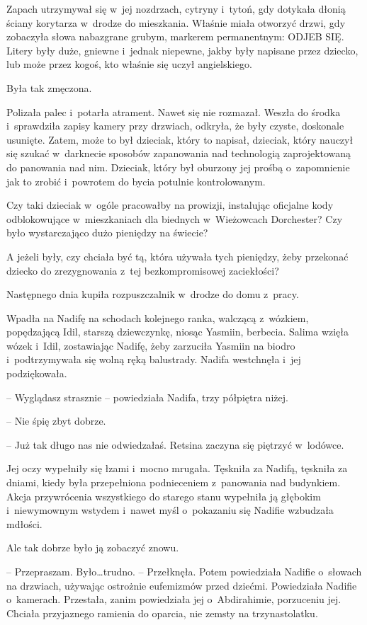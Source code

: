 \documentclass[oneside,polish,11pt,sfheadings]{mwbk}
\begin{document}
Zapach utrzymywał się w~jej nozdrzach, cytryny i~tytoń, gdy dotykała
dłonią ściany korytarza w~drodze do mieszkania. Właśnie miała otworzyć
drzwi, gdy zobaczyła słowa nabazgrane grubym, markerem permanentnym:
ODJEB SIĘ. Litery były duże, gniewne i~jednak niepewne, jakby były
napisane przez dziecko, lub może przez kogoś, kto właśnie się uczył
angielskiego.

Była tak zmęczona.

Polizała palec i~potarła atrament. Nawet się nie rozmazał. Weszła do
środka i~sprawdziła zapisy kamery przy drzwiach, odkryła, że były
czyste, doskonale usunięte. Zatem, może to był dzieciak, który to
napisał, dzieciak, który nauczył się szukać w~darknecie sposobów
zapanowania nad technologią zaprojektowaną do panowania nad nim.
Dzieciak, który był oburzony jej prośbą o~zapomnienie jak to zrobić i~powrotem do bycia potulnie kontrolowanym.

Czy taki dzieciak w~ogóle pracowałby na prowizji, instalując oficjalne
kody odblokowujące w~mieszkaniach dla biednych w~Wieżowcach Dorchester?
Czy było wystarczająco dużo pieniędzy na świecie?

A jeżeli były, czy chciała być tą, która używała tych pieniędzy, żeby
przekonać dziecko do zrezygnowania z~tej bezkompromisowej zaciekłości?

Następnego dnia kupiła rozpuszczalnik w~drodze do domu z~pracy.

Wpadła na Nadifę na schodach kolejnego ranka, walczącą z~wózkiem,
popędzającą Idil, starszą dziewczynkę, niosąc Yasmiin, berbecia. Salima
wzięła wózek i~Idil, zostawiając Nadifę, żeby zarzuciła Yasmiin na
biodro i~podtrzymywała się wolną ręką balustrady. Nadifa westchnęła i~jej podziękowała.

-- Wyglądasz strasznie -- powiedziała Nadifa, trzy półpiętra niżej.

-- Nie śpię zbyt dobrze.

-- Już tak długo nas nie odwiedzałaś. Retsina zaczyna się piętrzyć w~lodówce.

Jej oczy wypełniły się łzami i~mocno mrugała. Tęskniła za Nadifą,
tęskniła za dniami, kiedy była przepełniona podnieceniem z~panowania nad
budynkiem. Akcja przywrócenia wszystkiego do starego stanu wypełniła ją
głębokim i~niewymownym wstydem i~nawet myśl o~pokazaniu się Nadifie
wzbudzała mdłości.

Ale tak dobrze było ją zobaczyć znowu.

-- Przepraszam. Było\ldots  trudno. -- Przełknęła. Potem powiedziała Nadifie o~słowach na drzwiach, używając ostrożnie eufemizmów przed dziećmi.
Powiedziała Nadifie o~kamerach. Przestała, zanim powiedziała jej o~Abdirahimie, porzuceniu jej. Chciała przyjaznego ramienia do oparcia,
nie zemsty na trzynastolatku.
\end{document}
